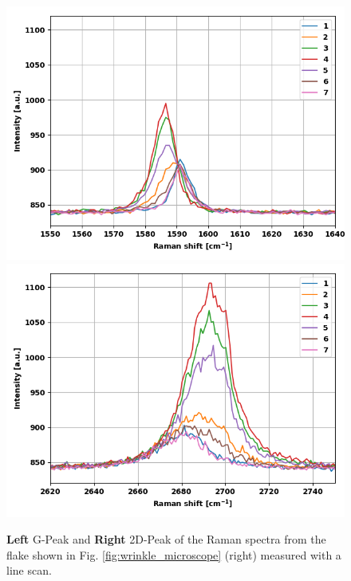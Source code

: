 \documentclass[12pt,a4paper]{article}
\begin{document}
\begin{figure}
\centering
\includegraphics[scale=0.5]{Bilder/Wrinkle/line_scan/line_scan_G_peak.PNG}
\includegraphics[scale=0.5]{Bilder/Wrinkle/line_scan/line_scan_2D_peak.PNG}
\caption{\textbf{Left} G-Peak and \textbf{Right} 2D-Peak of the Raman spectra from the flake shown in Fig. \ref{fig:wrinkle_microscope} (right) measured with a line scan.}
\label{fig:wrinkle_line_Peaks}
\end{figure}
\end{document}
